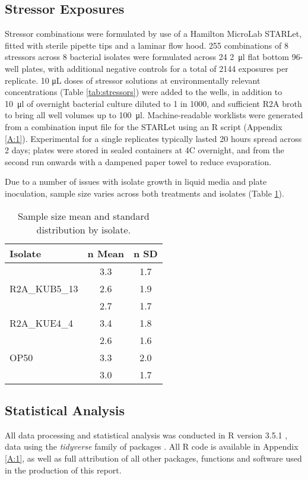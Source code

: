 \documentclass[review,12pt]{elsarticle}
\begin{document}
\subsection{Stressor Exposures}
\label{S:2:5}

Stressor combinations were formulated by use of a Hamilton MicroLab STARLet, fitted with sterile  pipette tips and a laminar flow hood. 255 combinations of 8 stressors across 8 bacterial isolates were formulated across 24 \SI{2}{\ul} flat bottom 96-well plates, with additional negative controls for a total of 2144 exposures per replicate.  10 μL doses of stressor solutions at environmentally relevant concentrations (Table \ref{tab:stressors}) were added to the wells, in addition to \SI{10}{\ul} of overnight bacterial culture diluted to 1 in 1000, and sufficient R2A broth to bring all well volumes up to \SI{100}{\ul}. Machine-readable worklists were generated from a combination input file for the STARLet using an R script (Appendix \ref{A:1}). Experimental for a single replicates typically lasted 20 hours spread across 2 days; plates were stored in sealed containers at 4\textdegree C overnight, and from the second run onwards with a dampened paper towel to reduce evaporation.

Due to a number of issues with isolate growth in liquid media and plate inoculation, sample size varies across both treatments and isolates (Table \ref{tab:samples}). 

\begin{table}[h]
\centering
\small
\begin{tabular}{l c c}
\toprule 
\textbf{Isolate} & \textbf{n Mean} & \textbf{n SD}  \\
\midrule
\rowcolor{black!20}{R2A\_LUF4\_5} & 3.3 & 1.7 \\
{R2A\_KUB5\_13} & 2.6 & 1.9 \\
\rowcolor{black!20}{R2A\_NUF1\_3} & 2.7 & 1.7\\
{R2A\_KUE4\_4} & 3.4 & 1.8\\
\rowcolor{black!20}{R2A\_NUE1\_1} & 2.6 & 1.6\\
{OP50} & 3.3 & 2.0 \\
\rowcolor{black!20}{Soil Community} & 3.0 & 1.7\\
\bottomrule
\end{tabular}
\caption{Sample size mean and standard distribution by isolate.}
\label{tab:samples}
\end{table}

\subsection{Statistical Analysis}
\label{S:2:6}
All data processing and statistical analysis was conducted in R version 3.5.1 \cite{RCoreTeam2018R:Computing}, data using the \textit{tidyverse} family of packages \cite{Wickham2017Tidyverse:Tidyverse}. All R code is available in Appendix \ref{A:1}, as well as full attribution of all other packages, functions and software used in the production of this report.
\end{document}
